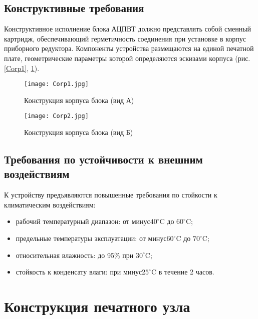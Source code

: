 
\FloatBarrier
\subsection{Конструктивные требования}
Конструктивное исполнение блока АЦПВТ должно представлять собой сменный картридж, обеспечивающий герметичность соединения при установке в корпус приборного 
редуктора. Компоненты устройства размещаются на единой печатной плате, 
геометрические параметры которой определяются эскизами корпуса (рис. \ref{Corp1}, \ref{Corp2}).

\begin{figure}[htbp]
    \centering
    \begin{minipage}{0.48\linewidth}%
       \centering
        \texttt{[image: Corp1.jpg]}
        \caption{Конструкция корпуса блока (вид А)}
        \label{Corp1}
    \end{minipage}\hfill%
    \begin{minipage}{0.48\linewidth}%
       \centering
        \texttt{[image: Corp2.jpg]}
        \caption{Конструкция корпуса блока (вид Б)}
        \label{Corp2}
    \end{minipage}
\end{figure}


\FloatBarrier
\subsection{Требования по устойчивости к внешним воздействиям}
К устройству предъявляются повышенные требования по стойкости к климатическим воздействиям:
\begin{itemize}
    \item рабочий температурный диапазон: от $\text{минус} 40^\circ$C до $ 60^\circ$C;
    \item предельные температуры эксплуатации: от $\text{минус}60^\circ$C до $70^\circ$C;
    \item относительная влажность: до 95\% при $30^\circ$C;
    \item стойкость к конденсату влаги: при $\text{минус}25^\circ$C в течение 2 часов.
\end{itemize}

\FloatBarrier
\section{Конструкция печатного узла}

